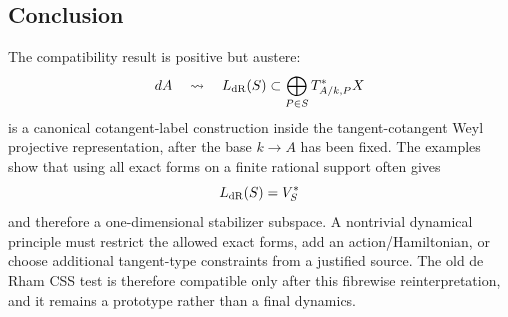 \subsection{Conclusion}

The compatibility result is positive but austere:
\[
  dA\quad\leadsto\quad L_{\rm dR}(S)\subset
  \bigoplus_{P\in S}T^*_{A/k,P}X
\]
is a canonical cotangent-label construction inside the tangent-cotangent Weyl
projective representation, after the base \(k\to A\) has been fixed.  The
examples show that using all exact forms on a finite rational support often gives
\[
  L_{\rm dR}(S)=V_S^*
\]
and therefore a one-dimensional stabilizer subspace.  A nontrivial dynamical
principle must restrict the allowed exact forms, add an action/Hamiltonian, or
choose additional tangent-type constraints from a justified source.  The old de
Rham CSS test is therefore compatible only after this fibrewise
reinterpretation, and it remains a prototype rather than a final dynamics.
